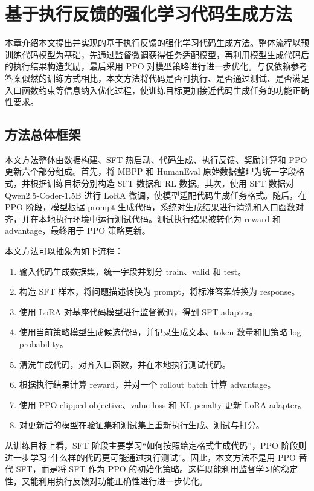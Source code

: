 
\chapter{基于执行反馈的强化学习代码生成方法}

本章介绍本文提出并实现的基于执行反馈的强化学习代码生成方法。整体流程以预训练代码模型为基础，先通过监督微调获得任务适配模型，再利用模型生成代码后的执行结果构造奖励，最后采用 PPO 对模型策略进行进一步优化。与仅依赖参考答案似然的训练方式相比，本文方法将代码是否可执行、是否通过测试、是否满足入口函数约束等信息纳入优化过程，使训练目标更加接近代码生成任务的功能正确性要求。

\section{方法总体框架}

本文方法整体由数据构建、SFT 热启动、代码生成、执行反馈、奖励计算和 PPO 更新六个部分组成。首先，将 MBPP 和 HumanEval 原始数据整理为统一字段格式，并根据训练目标分别构造 SFT 数据和 RL 数据。其次，使用 SFT 数据对 Qwen2.5-Coder-1.5B 进行 LoRA 微调，使模型适配代码生成任务格式。随后，在 PPO 阶段，模型根据 prompt 生成代码，系统对生成结果进行清洗和入口函数对齐，并在本地执行环境中运行测试代码。测试执行结果被转化为 reward 和 advantage，最终用于 PPO 策略更新。

本文方法可以抽象为如下流程：

\begin{enumerate}
  \item 输入代码生成数据集，统一字段并划分 train、valid 和 test。
  \item 构造 SFT 样本，将问题描述转换为 prompt，将标准答案转换为 response。
  \item 使用 LoRA 对基座代码模型进行监督微调，得到 SFT adapter。
  \item 使用当前策略模型生成候选代码，并记录生成文本、token 数量和旧策略 log probability。
  \item 清洗生成代码，对齐入口函数，并在本地执行测试代码。
  \item 根据执行结果计算 reward，并对一个 rollout batch 计算 advantage。
  \item 使用 PPO clipped objective、value loss 和 KL penalty 更新 LoRA adapter。
  \item 对更新后的模型在验证集和测试集上重新执行生成、测试与打分。
\end{enumerate}

从训练目标上看，SFT 阶段主要学习“如何按照给定格式生成代码”，PPO 阶段则进一步学习“什么样的代码更可能通过执行测试”。因此，本文方法不是用 PPO 替代 SFT，而是将 SFT 作为 PPO 的初始化策略。这样既能利用监督学习的稳定性，又能利用执行反馈对功能正确性进行进一步优化。

